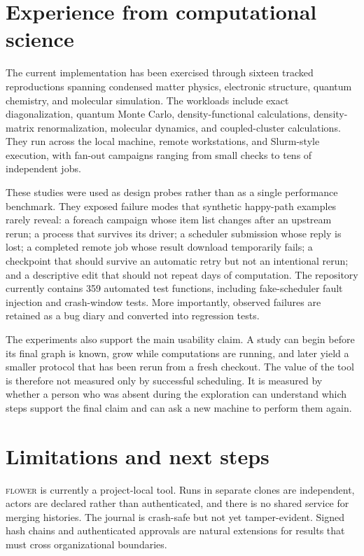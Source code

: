 \documentclass[10pt]{article}
\newcommand{\flower}{\textsc{flower}}
\begin{document}
\section{Experience from computational science}

The current implementation has been exercised through sixteen tracked reproductions spanning condensed
matter physics, electronic structure, quantum chemistry, and molecular simulation. The workloads include
exact diagonalization, quantum Monte Carlo, density-functional calculations, density-matrix renormalization,
molecular dynamics, and coupled-cluster calculations. They run across the local machine, remote workstations,
and Slurm-style execution, with fan-out campaigns ranging from small checks to tens of independent jobs.

These studies were used as design probes rather than as a single performance benchmark. They exposed failure
modes that synthetic happy-path examples rarely reveal: a foreach campaign whose item list changes after an
upstream rerun; a process that survives its driver; a scheduler submission whose reply is lost; a completed
remote job whose result download temporarily fails; a checkpoint that should survive an automatic retry but
not an intentional rerun; and a descriptive edit that should not repeat days of computation. The repository
currently contains 359 automated test functions, including fake-scheduler fault injection and crash-window
tests. More importantly, observed failures are retained as a bug diary and converted into regression tests.

The experiments also support the main usability claim. A study can begin before its final graph is known, grow
while computations are running, and later yield a smaller protocol that has been rerun from a fresh checkout.
The value of the tool is therefore not measured only by successful scheduling. It is measured by whether a
person who was absent during the exploration can understand which steps support the final claim and can ask a
new machine to perform them again.

\section{Limitations and next steps}

\flower{} is currently a project-local tool. Runs in separate clones are independent, actors are declared rather
than authenticated, and there is no shared service for merging histories. The journal is crash-safe but not
yet tamper-evident. Signed hash chains and authenticated approvals are natural extensions for results that must
cross organizational boundaries.
\end{document}
